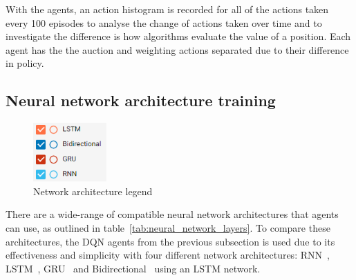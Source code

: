 With the agents, an action histogram is recorded for all of the actions taken every 100 episodes to analyse the change
of actions taken over time and to investigate the difference is how algorithms evaluate the value of a position. Each
agent has the the auction and weighting actions separated due to their difference in policy. \\


\subsection{Neural network architecture training}\label{subsec:neural-network-architecture-training}
\begin{figure}
    \includegraphics[width=0.25\textwidth]{figures/5_evaluation_figs/net_arch_training_fig/legend.png}
    \caption{Network architecture legend}
    \label{fig:net-arch-training-legend}
\end{figure}

There are a wide-range of compatible neural network architectures that agents can use, as outlined in
table~\ref{tab:neural_network_layers}. To compare these architectures, the DQN agents from the previous subsection is
used due to its effectiveness and simplicity with four different network architectures: RNN~\citep{RNN},
LSTM~\citep{LSTM}, GRU~\citep{GRU} and Bidirectional~\citep{Bidirectional} using an LSTM network. \\

